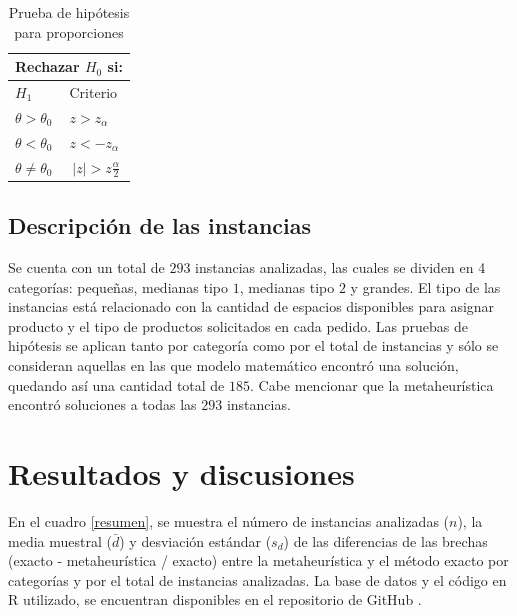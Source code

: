 \documentclass[preprint,12pt, pdftex]{elsarticle}
\begin{document}
\begin{table}[htp]
\caption{Prueba de hipótesis para proporciones}
\centering
\begin{tabular}{l|l}
\hline
\multicolumn{2}{c}{Rechazar $H_{0}$ si:}                                                                           \\ \hline
$H_{1}$          & \multicolumn{1}{l}{Criterio}                                                                     \\ \hline
$\theta > \theta_{0}$    & $z > z_{\alpha}$                                                                                  \\ \hline
$\theta < \theta_{0}$    & $z < -z_{\alpha}$                                                                                 \\ \hline
$\theta \not= \theta_{0}$ & \multicolumn{1}{c}{$|z| > z\frac{\alpha}{2}$} \\ \hline
\end{tabular}
\label{proporciones}
\end{table}

\subsection{\textbf{Descripción de las instancias}}

Se cuenta con un total de $293$ instancias analizadas, las cuales se dividen en 4 categorías: pequeñas, medianas tipo $1$, medianas tipo $2$ y grandes. El tipo de las instancias está relacionado con la cantidad de espacios disponibles para asignar producto y el tipo de productos solicitados en cada pedido. Las pruebas de hipótesis se aplican tanto por categoría como por el total de instancias y sólo se consideran aquellas en las que modelo matemático encontró una solución, quedando así una cantidad total de $185$. Cabe mencionar que la metaheurística encontró soluciones a todas las $293$ instancias.

\section{Resultados y discusiones} \label{experimentacion}

En el cuadro \ref{resumen}, se muestra el número de instancias analizadas ($n$), la media muestral ($\bar{d}$) y desviación estándar ($s_{d}$) de las diferencias de las brechas (exacto - metaheurística / exacto) entre la metaheurística y el método exacto por categorías y por el total de instancias analizadas. La base de datos y el código en R utilizado, se encuentran disponibles en el repositorio de GitHub \cite{github}.
\end{document}
